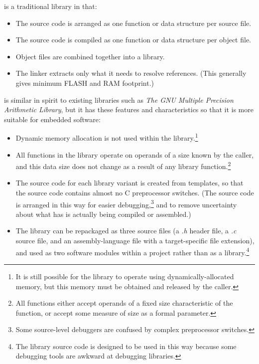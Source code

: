 \emph{\productbasenameshort{}} is a traditional
library in that:

\begin{itemize}
\item The source code is arranged as one function or data structure per source file.
\item The source code is compiled as one function or data structure per object file.
\item Object files are combined together into a library.
\item The linker extracts only what it needs to resolve references.  (This generally
      gives minimum FLASH and RAM footprint.)
\end{itemize}

\emph{\productbasenameshort{}} is similar in spirit to existing libraries such as
\emph{The GNU Multiple Precision Arithmetic Library}, but it has these features and
characteristics so that it is more suitable for embedded software:

\begin{itemize}
\item Dynamic memory allocation is not used within the library.\footnote{It is still
      possible for the library to operate using dynamically-allocated memory,
      but this memory must be obtained and released by the caller.}
\item All functions in the library operate on operands of a size known by the
      caller, and this data size does not change as a result of any
      library function.\footnote{All functions either accept operands of a fixed
      size characteristic of the function, or accept some measure of size
      as a formal parameter.}
\item The source code for each library variant is created from templates,
      so that the source code contains almost no C preprocessor
      switches.  (The source code is arranged in this way for
      easier debugging,\footnote{Some source-level debuggers are
      confused by complex preprocessor switches.} and to remove uncertainty about what has
      is actually being compiled or assembled.)
\item The library can be repackaged as three source files (a \emph{.h} header file, a \emph{.c}
      source file, and an assembly-language file with a target-specific file extension),
      and used as two software modules within a project rather than as a library.\footnote{The
      library source code is designed to be used in this way because some debugging tools
      are awkward at debugging libraries.}
\end{itemize}

